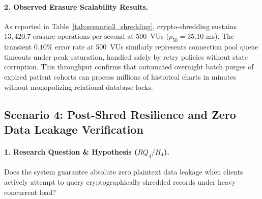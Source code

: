 \begin{table}[H]
  \centering
  \caption{Verifiable Crypto-Shredding Scalability under Concurrent Load (Scenario 3).}
  \label{tab:scenario3_shredding}
\end{table}

\paragraph{2. Observed Erasure Scalability Results.}
As reported in Table~\ref{tab:scenario3_shredding}, crypto-shredding sustains $13,420.7\text{~erasure operations per second}$ at 500~VUs ($p_{50} = 35.10\text{~ms}$). The transient $0.10\%$ error rate at 500~VUs similarly represents connection pool queue timeouts under peak saturation, handled safely by retry policies without state corruption. This throughput confirms that automated overnight batch purges of expired patient cohorts can process millions of historical charts in minutes without monopolizing relational database locks.

\subsection{Scenario 4: Post-Shred Resilience and Zero Data Leakage Verification}

\paragraph{1. Research Question \& Hypothesis ($RQ_4 / H_4$).}
Does the system guarantee absolute zero plaintext data leakage when clients actively attempt to query cryptographically shredded records under heavy concurrent load?

